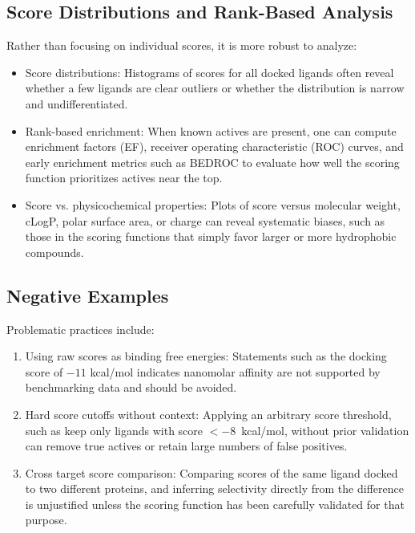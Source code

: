 \documentclass[12pt,a4paper]{article}
\begin{document}
\subsection{Score Distributions and Rank-Based Analysis}

Rather than focusing on individual scores, it is more robust to analyze:

\begin{itemize}
  \item Score distributions: Histograms of scores for all docked ligands often reveal whether a few ligands are clear outliers or whether the distribution is narrow and undifferentiated.
  \item Rank-based enrichment: When known actives are present, one can compute enrichment factors (EF), receiver operating characteristic (ROC) curves, and early enrichment metrics such as BEDROC to evaluate how well the scoring function prioritizes actives near the top.
  \item Score vs. physicochemical properties: Plots of score versus molecular weight, cLogP, polar surface area, or charge can reveal systematic biases, such as those in the scoring functions that simply favor larger or more hydrophobic compounds.
\end{itemize}

\subsection{Negative Examples}

Problematic practices include:

\begin{enumerate}
  \item Using raw scores as binding free energies: Statements such as the docking score of $-11$ kcal/mol indicates nanomolar affinity are not supported by benchmarking data and should be avoided.\cite{CH8_Warren2006}
  \item Hard score cutoffs without context: Applying an arbitrary score threshold, such as keep only ligands with score $<-8$~kcal/mol, without prior validation can remove true actives or retain large numbers of false positives.
  \item Cross target score comparison: Comparing scores of the same ligand docked to two different proteins, and inferring selectivity directly from the difference is unjustified unless the scoring function has been carefully validated for that purpose.
\end{enumerate}
\end{document}
